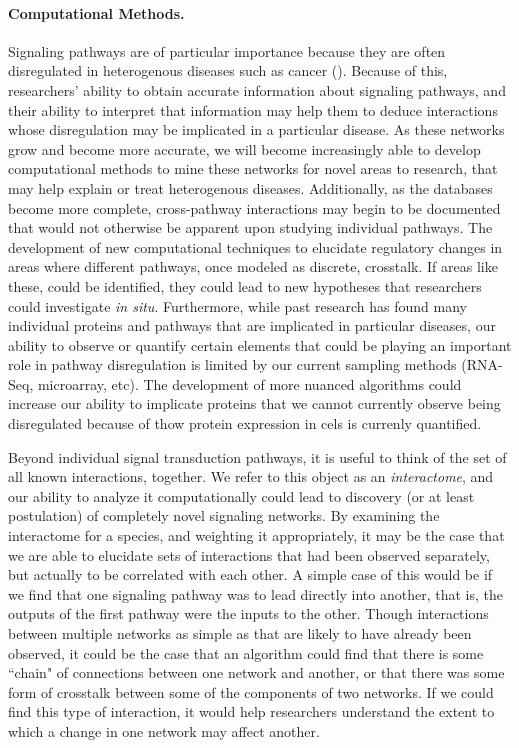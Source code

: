 \documentclass[12pt,twoside]{reedthesis}
\theoremstyle{definition}
\begin{document}
\paragraph{Computational Methods.}
Signaling pathways are of particular importance because they are often disregulated in heterogenous diseases such as cancer (\cite{papers}). Because of this, researchers' ability to obtain accurate information about signaling pathways, and their ability to interpret that information may help them to deduce interactions whose disregulation may be implicated in a particular disease. As these networks grow and become more accurate, we will become increasingly able to develop computational methods to mine these networks for novel areas to research, that may help explain or treat heterogenous diseases. Additionally, as the databases become more complete, cross-pathway interactions may begin to be documented that would not otherwise be apparent upon studying individual pathways. The development of new computational techniques to elucidate regulatory changes in areas where different pathways, once modeled as discrete, crosstalk. If areas like these, could be identified, they could lead to new hypotheses that researchers could investigate \textit{in situ}. Furthermore, while past research has found many individual proteins and pathways that are implicated in particular diseases, our ability to observe or quantify certain elements that could be playing an important role in pathway disregulation is limited by our current sampling methods (RNA-Seq, microarray, etc). The development of more nuanced algorithms could increase our ability to implicate proteins that we cannot currently observe being disregulated because of thow protein expression in cels is currenly quantified.\par

Beyond individual signal transduction pathways, it is useful to think of the set of all known interactions, together. We refer to this object as an \textit{interactome}, and our ability to analyze it computationally could lead to discovery (or at least postulation) of completely novel signaling networks. By examining the interactome for a species, and weighting it appropriately, it may be the case that we are able to elucidate sets of interactions that had been observed separately, but actually to be correlated with each other. A simple case of this would be if we find that one signaling pathway was to lead directly into another, that is, the outputs of the first pathway were the inputs to the other. Though interactions between multiple networks as simple as that are likely to have already been observed, it could be the case that an algorithm could find that there is some ``chain" of connections between one network and another, or that there was some form of crosstalk between some of the components of two networks. If we could find this type of interaction, it would help researchers understand the extent to which a change in one network may affect another.\par
\end{document}
